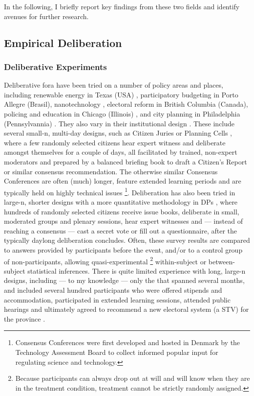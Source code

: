 In the following, I briefly report key findings from these two fields and identify avenues for further research.

\subsection{Empirical Deliberation}

\subsubsection{Deliberative Experiments}
Deliberative fora have been tried on a number of policy areas and places, including renewable energy in Texas (USA) \citep{LehrGuild-2003-aa}, participatory budgeting in Porto Allegre \citep{CoelhoPozzono-2005-aa} (Brasil), nanotechnology \citep{Powell2008}, electoral reform in British Columbia (Canada), policing and education in Chicago (Illinois) \citep{WarrenPearse-2008-aa}, and city planning in Philadelphia (Pennsylvannia) \citep{Sokoloff2005}. 
They also vary in their institutional design \citep[reviewed in][]{Fung-2003-ac}.
These include several small-n, multi-day designs, such as Citizen Juries \citep{SmithWales-2000-aa} or Planning Cells \citep{Dienel-1999-aa}, where a few randomly selected citizens hear expert witness and deliberate amongst themselves for a couple of days, all facilitated by trained, non-expert moderators and prepared by a balanced briefing book to draft a Citizen's Report or similar consensus recommendation.
The otherwise similar Consensus Conferences \citep{Einsiedel2000} are often (much) longer, feature extended learning periods and are typically held on highly technical issues
\footnote{
	Consensus Conferences were first developed and hosted in Denmark by the Technology Assessment Board to collect informed popular input for regulating science and technology.
}.
Deliberation has also been tried in large-n, shorter designs with a more quantitative methodology in \gls{DP}s \citep{FishkinFarrar-2005-aa}, where hundreds of randomly selected citizens receive issue books, deliberate in small, moderated groups and plenary sessions, hear expert witnesses and --- instead of reaching a consensus --- cast a secret vote or fill out a questionnaire, after the typically daylong deliberation concludes. 
Often, these survey results are compared to answers provided by participants before the event, and/or to a control group of non-participants, allowing quasi-experimental
\footnote{
	Because participants can always drop out at will and will know when they are in the treatment condition, treatment cannot be strictly randomly assigned.
	}
within-subject or between-subject statistical inferences. 
There is quite limited experience with long, large-n designs, including --- to my knowledge --- only the  \citep{WarrenPearse-2008-aa} that spanned several months, and included several hundred participants who were offered stipends and accommodation, participated in extended learning sessions, attended public hearings and ultimately agreed to recommend a new electoral system (a \gls{STV}) for the province \citep{Citizen-2004-aa}.

